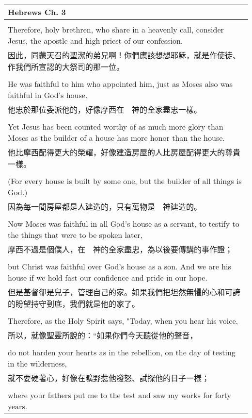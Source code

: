 \begin{tabularx}{\textwidth}{p{}}
\hline
Hebrews Ch. 3 \\
\hline \\
Therefore, holy brethren, who share in a heavenly call, consider Jesus, the apostle and high priest of our confession. \\
因此，同蒙天召的聖潔的弟兄啊！你們應該想想耶穌，就是作使徒、作我們所宣認的大祭司的那一位。 \\ \\
He was faithful to him who appointed him, just as Moses also was faithful in God's house. \\
他忠於那位委派他的，好像摩西在　神的全家盡忠一樣。 \\ \\
Yet Jesus has been counted worthy of as much more glory than Moses as the builder of a house has more honor than the house. \\
他比摩西配得更大的榮耀，好像建造房屋的人比房屋配得更大的尊貴一樣。 \\ \\
(For every house is built by some one, but the builder of all things is God.) \\
因為每一間房屋都是人建造的，只有萬物是　神建造的。 \\ \\
Now Moses was faithful in all God's house as a servant, to testify to the things that were to be spoken later, \\
摩西不過是個僕人，在　神的全家盡忠，為以後要傳講的事作證； \\ \\
but Christ was faithful over God's house as a son. And we are his house if we hold fast our confidence and pride in our hope. \\
但是基督卻是兒子，管理自己的家。如果我們把坦然無懼的心和可誇的盼望持守到底，我們就是他的家了。 \\ \\
Therefore, as the Holy Spirit says, "Today, when you hear his voice, \\
所以，就像聖靈所說的：“如果你們今天聽從他的聲音， \\ \\
do not harden your hearts as in the rebellion, on the day of testing in the wilderness, \\
就不要硬著心，好像在曠野惹他發怒、試探他的日子一樣； \\ \\
where your fathers put me to the test and saw my works for forty years. \\

\end{tabularx}
